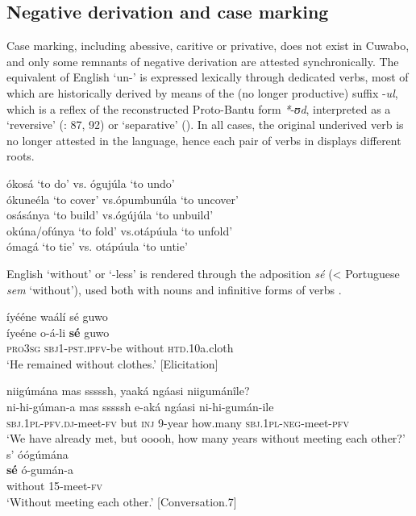 \documentclass[output=paper,colorlinks=true, citecolor=brown,draftmode]{langscibook}
\begin{document}
\subsection{Negative derivation and case marking}\label{sec:cuw:3.3}
Case marking, including abessive, caritive or privative, does not exist in Cuwabo, and only some remnants of negative derivation are attested synchronically. The equivalent of English ‘un-’ is expressed lexically through dedicated verbs, most of which are historically derived by means of the (no longer productive) suffix {}-\textit{ul}, which is a reflex of the reconstructed Proto-Bantu form \textit{*}{}-\textit{ʊd}, interpreted as a ‘reversive’ (\citealt{Meeussen1967}: 87, 92) or ‘separative’ (\citealt{Schadeberg1982, Schadeberg2003}). In all cases, the original underived verb is no longer attested in the language, hence each pair of verbs in  displays different roots.

\ea\label{ex:cuw:64} 
ókosá ‘to do’ \tab  vs. \tab  ógujúla ‘to undo’ \\
ókuneéla ‘to cover’ \tab  vs.\tab  ópumbunúla ‘to uncover’ \\
osásánya ‘to build’ \tab  vs.\tab  ógújúla ‘to unbuild’ \\
okúna/ofúnya ‘to fold’ \tab  vs.\tab  otápúula ‘to unfold’ \\
ómagá ‘to tie’ \tab  vs. \tab otápúula ‘to untie’ \\
\z 

English ‘without’ or ‘-less’ is rendered through the adposition \textit{sé} (< Portuguese \textit{sem} ‘without’), used both with nouns  and infinitive forms of verbs .


\ea\label{ex:cuw:65} íyééne waálí sé guwo\\
    \gll íyeéne o-á-li \textbf{sé} guwo \\
           \textsc{pro3sg} \textsc{sbj1-pst.ipfv-}be\textsc{} without \textsc{htd.}10a.cloth\\
    \glt ‘He remained without clothes.’ [Elicitation]
\z 

\ea\label{ex:cuw:66}
    \begin{xlist}[A: ]
    \label{ex:cuw:66A} niigúmána mas sssssh, yaaká ngáasi niigumánîle? \\ 
        \gll ni-hi-gúman-a mas sssssh e-aká ngáasi ni-hi-gumán-ile \\ 
             \textsc{sbj.1pl-pfv.dj}{}-meet-\textsc{fv} but \textsc{inj} 9-year how.many \textsc{sbj.1pl-neg}{}-meet-\textsc{pfv}\\
        \glt ‘We have already met, but ooooh, how many years without meeting each other?’  
    \label{ex:cuw:66B} s’ óógúmána \\ 
        \gll \textbf{sé} ó-gumán-a\\
          without \textsc{15}{}-meet-\textsc{fv}\\
    \glt ‘Without meeting each other.’ [Conversation.7]
    \end{xlist}
\z 
\end{document}

